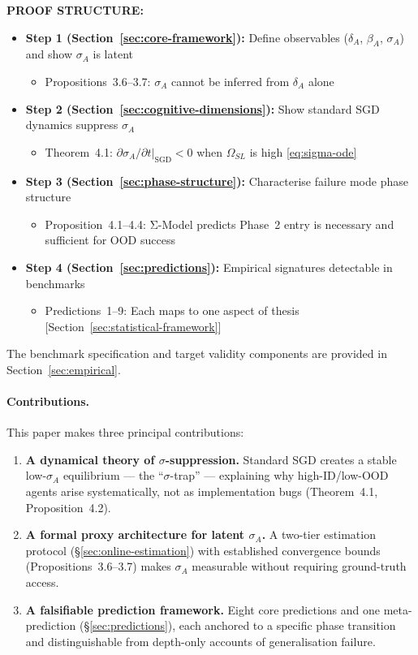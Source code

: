 \textbf{PROOF STRUCTURE:}
\begin{itemize}[nosep]
\item \textbf{Step 1 (Section~\ref{sec:core-framework}):} Define observables ($\delta_A$, $\beta_A$, $\sigma_A$) and show $\sigma_A$ is latent
  \begin{itemize}[nosep]
  \item Propositions~3.6--3.7: $\sigma_A$ cannot be inferred from $\delta_A$ alone %
  \end{itemize}
\item \textbf{Step 2 (Section~\ref{sec:cognitive-dimensions}):} Show standard SGD dynamics suppress $\sigma_A$
  \begin{itemize}[nosep]
  \item Theorem~4.1: $\partial\sigma_A/\partial t|_{\text{SGD}} < 0$ when $\Omega_{SL}$ is high \eqref{eq:sigma-ode}
  \end{itemize}
\item \textbf{Step 3 (Section~\ref{sec:phase-structure}):} Characterise failure mode phase structure
  \begin{itemize}[nosep]
  \item Proposition~4.1--4.4: Σ-Model predicts Phase~2 entry is necessary and sufficient for OOD success
  \end{itemize}
\item \textbf{Step 4 (Section~\ref{sec:predictions}):} Empirical signatures detectable in benchmarks
  \begin{itemize}[nosep]
  \item Predictions~1--9: Each maps to one aspect of thesis [Section~\ref{sec:statistical-framework}]
  \end{itemize}
\end{itemize}

The benchmark specification and target validity
components are provided in Section~\ref{sec:empirical}.

\paragraph*{Contributions.}
This paper makes three principal contributions:
\begin{enumerate}[nosep]
\item \textbf{A dynamical theory of $\sigma$-suppression.}
  Standard SGD creates a stable low-$\sigma_A$ equilibrium --- the
  ``$\sigma$-trap'' --- explaining why high-ID/low-OOD agents arise
  systematically, not as implementation bugs
  (Theorem~4.1, Proposition~4.2).
\item \textbf{A formal proxy architecture for latent $\sigma_A$.}
  A two-tier estimation protocol (\S\ref{sec:online-estimation}) with
  established convergence bounds (Propositions~3.6--3.7) makes $\sigma_A$
  measurable without requiring ground-truth access.
\item \textbf{A falsifiable prediction framework.}
  Eight core predictions and one meta-prediction (\S\ref{sec:predictions}),
  each anchored to a specific phase transition and distinguishable from
  depth-only accounts of generalisation failure.
\end{enumerate}

